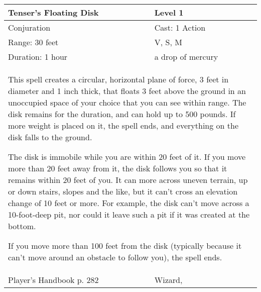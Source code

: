 \documentclass[11pt]{report}
\begin{document}
\begin{table}[H]
	\begin{tabular}{||p{6cm}|p{6cm}||}
		\hline\hline
		\bf{Tenser’s Floating Disk} & Level 1\\ \hline
		Conjuration & Cast: 1 Action\\ \hline
		Range: 30 feet & V, S, M\\ \hline
		Duration: 1 hour & a drop of mercury\\ \hline
		\multicolumn{2}{||p{12cm}||}{This spell creates a circular, horizontal plane of force, 3 feet in diameter and 1 inch thick, that floats 3 feet above the ground in an unoccupied space of your choice that you can see within range.
The disk remains for the duration, and can hold up to 500 pounds. If more weight is placed on it, the spell ends, and everything on the disk falls to the ground.

The disk is immobile while you are within 20 feet of it. If you move more than 20 feet away from it, the disk follows you so that it remains within 20 feet of you. It can more across uneven terrain, up or down stairs, slopes and the like, but it can’t cross an elevation change of 10 feet or more. For example, the disk can’t move across a 10-foot-deep pit, nor could it leave such a pit if it was created at the bottom.

If you move more than 100 feet from the disk (typically because it can’t move around an obstacle to follow you), the spell ends.}\\ \hline
Player's Handbook p. 282 & Wizard, \\ \hline\hline
	\end{tabular}
\end{table}
\end{document}
